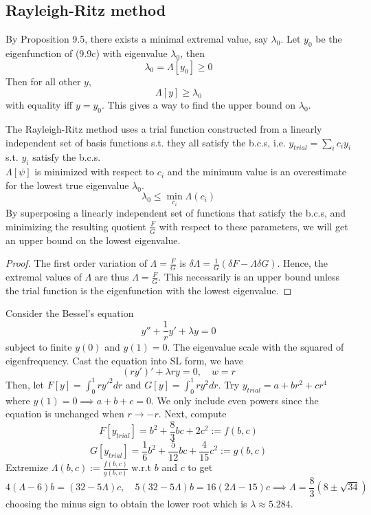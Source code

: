 \documentclass[a4paper]{article}
\begin{document}
\subsection{Rayleigh-Ritz method}
By Proposition 9.5, there exists a minimal extremal value, say $\lambda_0$. Let $y_0$ be the eigenfunction of (9.9c) with eigenvalue $\lambda_0$, then
\begin{equation}
    \lambda_0=\Lambda[y_0]\geq0\tag{9.12}
\end{equation}
Then for all other $y$,
\begin{equation}
    \Lambda[y]\geq\lambda_0\tag{9.13}
\end{equation}
with equality iff $y=y_0$. This gives a way to find the upper bound on $\lambda_0$.
\begin{prop}
The Rayleigh-Ritz method uses a trial function constructed from a linearly independent set of basis functions s.t. they all satisfy the b.c.s, i.e. $y_{trial}=\sum_ic_iy_i$ s.t. $y_i$ satisfy the b.c.s. \\[5pt]
$\Lambda[\psi]$ is minimized with respect to $c_i$ and the minimum value is an overestimate for the lowest true eigenvalue $\lambda_0$.
\begin{equation}
\lambda_0\leq\min_{c_i}\Lambda(c_i)\tag{9.14}
\end{equation}
By superposing a linearly independent set of functions that satisfy the b.c.s, and minimizing the resulting quotient $\frac{F}{G}$ with respect to these parameters, we will get an upper bound on the lowest eigenvalue.
\end{prop}
\begin{proof}
The first order variation of $\Lambda=\frac{F}{G}$ is $\delta\Lambda=\frac{1}{G}(\delta F-\Lambda\delta G)$. Hence, the extremal values of $\Lambda$ are thus $\Lambda=\frac{F}{G}$. This necessarily is an upper bound unless the trial function is the eigenfunction with the lowest eigenvalue.
\end{proof}
\begin{eg}
Consider the Bessel's equation 
$$y''+\frac{1}{r}y'+\lambda y=0$$
subject to finite $y(0)$ and $y(1)=0$. The eigenvalue scale with the squared of eigenfrequency. Cast the equation into SL form, we have
$$(ry')'+\lambda ry=0,\quad w=r$$
Then, let $F[y]=\int_0^1ry'^2dr$ and $G[y]=\int_0^1ry^2dr$. Try $y_{trial}=a+br^2+cr^4$ where $y(1)=0\implies a+b+c=0$. We only include even powers since the equation is unchanged when $r\rightarrow -r$. Next, compute
$$F[y_{trial}]=b^2+\frac{8}{3}bc+2c^2:=f(b,c)$$
$$G[y_{trial}]=\frac{1}{6}b^2+\frac{5}{12}bc+\frac{4}{15}c^2:=g(b,c)$$
Extremize $\Lambda(b,c):=\frac{f(b,c)}{g(b,c)}$ w.r.t $b$ and $c$ to get
$$4(\Lambda-6)b=(32-5\Lambda)c,\quad 5(32-5\Lambda)b=16(2\Lambda-15)c\implies\Lambda=\frac{8}{3}(8\pm\sqrt{34})$$
choosing the minus sign to obtain the lower root which is $\lambda\approx5.284$.
\end{eg}
\end{document}

